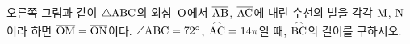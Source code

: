 \noindent\begin{minipage}[t]{0.58\linewidth}\vspace{0pt}\raggedright 오른쪽 그림과 같이 $\triangle\mathrm{ABC}$의 외심~$\mathrm{O}$에서 $\overline{\mathrm{AB}}$, $\overline{\mathrm{AC}}$에 내린 수선의 발을 각각 $\mathrm{M}$, $\mathrm{N}$이라 하면 $\overline{\mathrm{OM}}=\overline{\mathrm{ON}}$이다. $\angle\mathrm{ABC}=72^\circ$, $\overset{\frown}{\mathrm{AC}}=14\pi$일 때, $\overset{\frown}{\mathrm{BC}}$의 길이를 구하시오.\end{minipage}\hfill\begin{minipage}[t]{0.4\linewidth}\vspace{0pt}\centering \resizebox{\ifdim\width>\linewidth\linewidth\else\width\fi}{!}{}\end{minipage}\par
